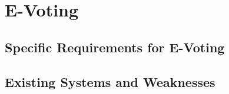 
\chapter{E-Voting}
\label{ch:ev}

\section{Specific Requirements for E-Voting}
\label{ch:ev:specific}


\section{Existing Systems and Weaknesses}
\label{ch:ev:existing}

